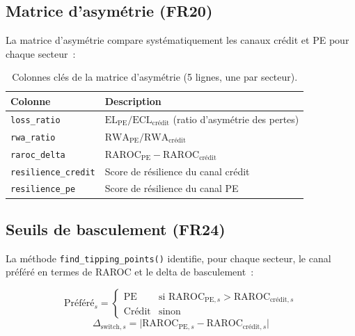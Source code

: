 \documentclass[12pt,a4paper]{article}
\begin{document}
\subsection{Matrice d'asym\'etrie (FR20)}

La matrice d'asym\'etrie compare syst\'ematiquement les canaux cr\'edit et PE pour chaque secteur~:

\begin{table}[h]
\centering
\small
\begin{tabular}{lp{9cm}}
\toprule
\textbf{Colonne} & \textbf{Description} \\
\midrule
\texttt{loss\_ratio} & $\text{EL}_{\text{PE}} / \text{ECL}_{\text{cr\'edit}}$ (ratio d'asym\'etrie des pertes) \\
\texttt{rwa\_ratio} & $\text{RWA}_{\text{PE}} / \text{RWA}_{\text{cr\'edit}}$ \\
\texttt{raroc\_delta} & $\text{RAROC}_{\text{PE}} - \text{RAROC}_{\text{cr\'edit}}$ \\
\texttt{resilience\_credit} & Score de r\'esilience du canal cr\'edit \\
\texttt{resilience\_pe} & Score de r\'esilience du canal PE \\
\bottomrule
\end{tabular}
\caption{Colonnes cl\'es de la matrice d'asym\'etrie (5 lignes, une par secteur).}
\label{tab:asymmetry}
\end{table}

\subsection{Seuils de basculement (FR24)}

La m\'ethode \texttt{find\_tipping\_points()} identifie, pour chaque secteur, le canal pr\'ef\'er\'e en termes de RAROC et le delta de basculement~:

\begin{equation}
    \text{Pr\'ef\'er\'e}_s = \begin{cases} \text{PE} & \text{si } \text{RAROC}_{\text{PE},s} > \text{RAROC}_{\text{cr\'edit},s} \\ \text{Cr\'edit} & \text{sinon} \end{cases}
\end{equation}
\begin{equation}
    \Delta_{\text{switch},s} = \bigl|\text{RAROC}_{\text{PE},s} - \text{RAROC}_{\text{cr\'edit},s}\bigr|
\end{equation}
\end{document}
